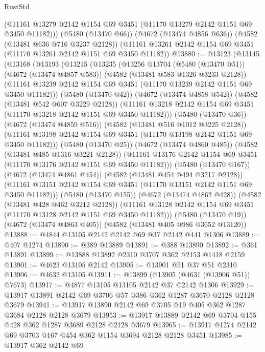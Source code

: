 \begin{lexlean}{RustStd}
\begin{coremodule}
      (@11161 @13279 @2142 @1154 @69 @3451 (@11170 @13279 @2142 @1151 @69 @3450 @11182)))
    (@5480 (@13470 @66))
    (@4672 (@13474 @4856 @636))
    (@4582 (@13481 @636 @716 @3237 @2128))
    (@11161 @13261 @2142 @1154 @69 @3451 (@11170 @13261 @2142 @1151 @69 @3450 @11182))
@13880 := @13123
    (@13145
      (@13168
        (@13193
          (@13215
            (@13235
              (@13256
                @13704
                (@5480 (@13470 @51))
                (@4672 (@13474 @4857 @583))
                (@4582 (@13481 @583 @1326 @3233 @2128))
                (@11161 @13239 @2142 @1154 @69 @3451 (@11170 @13239 @2142 @1151 @69 @3450 @11182)))
              (@5480 (@13470 @42))
              (@4672 (@13474 @4858 @542))
              (@4582 (@13481 @542 @607 @3229 @2128))
              (@11161 @13218 @2142 @1154 @69 @3451 (@11170 @13218 @2142 @1151 @69 @3450 @11182)))
            (@5480 (@13470 @36))
            (@4672 (@13474 @4859 @516))
            (@4582 (@13481 @516 @1012 @3225 @2128))
            (@11161 @13198 @2142 @1154 @69 @3451 (@11170 @13198 @2142 @1151 @69 @3450 @11182)))
          (@5480 (@13470 @25))
          (@4672 (@13474 @4860 @485))
          (@4582 (@13481 @485 @1316 @3221 @2128))
          (@11161 @13176 @2142 @1154 @69 @3451 (@11170 @13176 @2142 @1151 @69 @3450 @11182)))
        (@5480 (@13470 @167))
        (@4672 (@13474 @4861 @454))
        (@4582 (@13481 @454 @494 @3217 @2128))
        (@11161 @13151 @2142 @1154 @69 @3451 (@11170 @13151 @2142 @1151 @69 @3450 @11182)))
      (@5480 (@13470 @155))
      (@4672 (@13474 @4862 @428))
      (@4582 (@13481 @428 @462 @3212 @2128))
      (@11161 @13128 @2142 @1154 @69 @3451 (@11170 @13128 @2142 @1151 @69 @3450 @11182)))
    (@5480 (@13470 @19))
    (@4672 (@13474 @4863 @405))
    (@4582 (@13481 @405 @986 @3652 @13120))
@13888 := @4844 @13105 @2142 @2142 @69 @37 @2142 @441 @1306
@13889 := @407 @1274
@13890 := @389 @13889
@13891 := @388 @13890
@13892 := @361 @13891
@13899 := @13888 @13892 @2310 @3707 @362 @2153 @1418 @2159
@13901 := @4623 @13105 @2142
@13905 := @13901 @51 @37 @51 @2310
@13906 := @4632 @13105
@13911 := @13899 (@13905 (@4631 (@13906 @51)) @7673)
@13917 := @4877 @13105 @13105 @2142 @37 @2142 @1306
@13929 := @13917 @13891 @2142 @69 @3706 @57 @386 @362 @1287 @3670 @2128 @2128 @3679
@13941 := @13917 @13890 @2142 @69 @3705 @19 @405 @362 @1287 @3684 @2128 @2128 @3679
@13953 := @13917 @13889 @2142 @69 @3704 @155 @428 @362 @1287 @3689 @2128 @2128 @3679
@13965 := @13917 @1274 @2142 @69 @3703 @167 @454 @362 @1154 @3694 @2128 @2128 @3451
@13985 := @13917
    @362
    @2142
    @69

\end{coremodule}
\end{lexlean}
